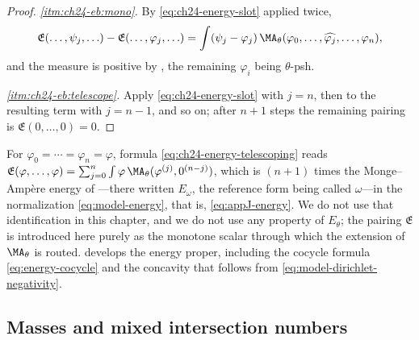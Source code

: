 \begin{proof}
\emph{\cref{itm:ch24-eb:mono}.}  By \eqref{eq:ch24-energy-slot} applied
twice,
\[
 \mathfrak E(\ldots,\psi_j,\ldots)-\mathfrak E(\ldots,\varphi_j,\ldots)
 =\int(\psi_j-\varphi_j)\,
   \MA_\theta(\varphi_0,\ldots,\widehat{\varphi_j},\ldots,\varphi_n),
\]
and the measure is positive by , the remaining
\(\varphi_i\) being \(\theta\)-psh.

\emph{\cref{itm:ch24-eb:telescope}.}  Apply \eqref{eq:ch24-energy-slot} with
\(j=n\), then to the resulting term with \(j=n-1\), and so on; after \(n+1\)
steps the remaining pairing is \(\mathfrak E(0,\ldots,0)=0\).
\end{proof}

\begin{remark}
\label{rem:ch24-energy-vs-E}
For \(\varphi_0=\cdots=\varphi_n=\varphi\), formula
\eqref{eq:ch24-energy-telescoping} reads
\(\mathfrak E(\varphi,\ldots,\varphi)
 =\sum_{j=0}^n\int\varphi\,
   \MA_\theta(\varphi^{(j)},0^{(n-j)})\),
which is \((n+1)\) times the Monge--Amp\`ere energy of
---there written \(E_\omega\), the reference form
being called \(\omega\)---in the normalization
\eqref{eq:model-energy}, that is, \eqref{eq:appJ-energy}.  We do not use
that identification in this chapter,
and we do not use any property of \(E_\theta\); the pairing
\(\mathfrak E\) is introduced here purely as the monotone scalar through
which the extension of \(\MA_\theta\) is routed.  
develops the energy proper, including the cocycle formula
\eqref{eq:energy-cocycle} and the concavity that follows from
\eqref{eq:model-dirichlet-negativity}.
\end{remark}

\subsection{Masses and mixed intersection numbers}
\label{sec:ch24-masses}

